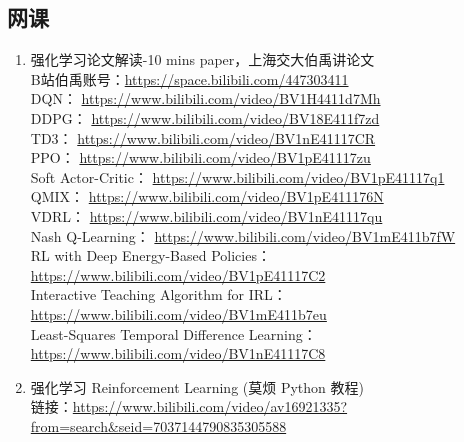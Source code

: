 \documentclass[lang=cn,11pt,a4paper]{elegant_template}
\begin{document}
\subsection{网课}
\begin{enumerate}
    \item 强化学习论文解读-10 mins paper，上海交大伯禹讲论文 \\
    B站伯禹账号：\href{https://space.bilibili.com/447303411}{https://space.bilibili.com/447303411}  \\
    DQN： \href{https://www.bilibili.com/video/BV1H4411d7Mh}{https://www.bilibili.com/video/BV1H4411d7Mh}  \\
    DDPG： \href{https://www.bilibili.com/video/BV18E411f7zd}{https://www.bilibili.com/video/BV18E411f7zd}  \\
    TD3： \href{https://www.bilibili.com/video/BV1nE41117CR}{https://www.bilibili.com/video/BV1nE41117CR}  \\
    PPO： \href{https://www.bilibili.com/video/BV1pE41117zu}{https://www.bilibili.com/video/BV1pE41117zu}  \\
    Soft Actor-Critic： \href{https://www.bilibili.com/video/BV1pE41117q1}{https://www.bilibili.com/video/BV1pE41117q1}  \\
    QMIX： \href{https://www.bilibili.com/video/BV1pE411176N}{https://www.bilibili.com/video/BV1pE411176N}  \\
    VDRL： \href{https://www.bilibili.com/video/BV1nE41117qu}{https://www.bilibili.com/video/BV1nE41117qu}  \\
    Nash Q-Learning： \href{https://www.bilibili.com/video/BV1mE411b7fW}{https://www.bilibili.com/video/BV1mE411b7fW}  \\
    RL with Deep Energy-Based Policies： \href{https://www.bilibili.com/video/BV1pE41117C2}{https://www.bilibili.com/video/BV1pE41117C2}  \\
    Interactive Teaching Algorithm for IRL： \href{https://www.bilibili.com/video/BV1mE411b7eu}{ https://www.bilibili.com/video/BV1mE411b7eu} \\
    Least-Squares Temporal Difference Learning： \href{https://www.bilibili.com/video/BV1nE41117C8}{https://www.bilibili.com/video/BV1nE41117C8}
    \item 强化学习 Reinforcement Learning (莫烦 Python 教程) \\
    链接：\href{https://www.bilibili.com/video/av16921335?from=search&seid=7037144790835305588}{https://www.bilibili.com/video/av16921335?from=search\&seid=7037144790835305588} \\

\end{enumerate}
\end{document}

